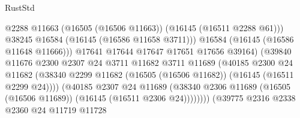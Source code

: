 \begin{lexlean}{RustStd}
\begin{coremodule}
                                                @2288
                                                @11663
                                                (@16505 (@16506 @11663))
                                                (@16145 (@16511 @2288 @61)))
                                              @38245
                                              @16584
                                              (@16145 (@16586 @11658 @3711)))
                                            @16584
                                            (@16145 (@16586 @11648 @11666)))
                                          @17641
                                          @17644
                                          @17647
                                          @17651
                                          @17656
                                          @39164)
                                        (@39840
                                          @11676
                                          @2300
                                          @2307
                                          @24
                                          @3711
                                          @11682
                                          @3711
                                          @11689
                                          (@40185
                                            @2300
                                            @24
                                            @11682
                                            (@38340
                                              @2299
                                              @11682
                                              (@16505 (@16506 @11682))
                                              (@16145 (@16511 @2299 @24))))
                                          (@40185
                                            @2307
                                            @24
                                            @11689
                                            (@38340
                                              @2306
                                              @11689
                                              (@16505 (@16506 @11689))
                                              (@16145 (@16511 @2306 @24))))))))
                                  (@39775
                                    @2316
                                    @2338
                                    @2360
                                    @24
                                    @11719
                                    @11728

\end{coremodule}
\end{lexlean}
